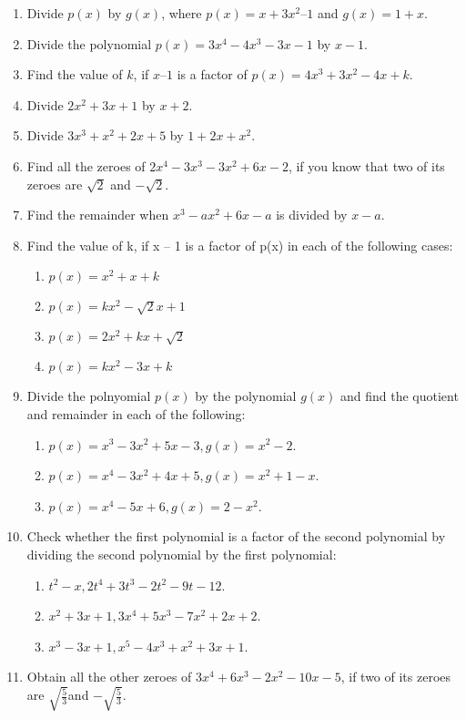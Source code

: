 \begin{enumerate}[label=\thesubsection.\arabic*, ref=\thesubsection.\theenumi,resume*]
%
\item Divide $p(x)$ by $g(x)$, where $p(x) = x + 3x^2– 1$ and $g(x) = 1 + x$.
\item Divide the polynomial $p(x) = 3x^4-4x^3-3x-1 $ by $x-1$.
\item Find the value of $k$, if $x – 1$ is a factor of $p(x) = 4x^3+ 3x^2 - 4x + k$.
%
\item Divide $2x^2+3x+1$ by $x+2$.
\item Divide $3x^3+x^2+2x+5$ by $1+2x+x^2$.
\item Find all the zeroes of $2x^4-3x^3-3x^2+6x-2$, if you know that two of its zeroes are $\sqrt{2}$ and $-\sqrt{2}$.
\item Find the remainder when $x^3-ax^2 +6x-a$ is divided by $x-a$.
\item Find the value of k, if x – 1 is a factor of p(x) in each of the following cases: 
\begin{enumerate}
\item $p(x) = x^2 + x + k$
\item $p(x) = kx^2-\sqrt{2}x+1$
\item $p(x) = 2x^2 + kx + \sqrt{2}$
\item $p(x) = kx^2  - 3x + k$
\end{enumerate}
\item Divide the polnyomial $p(x)$ by the polynomial $g(x)$ and find the quotient and remainder in each of the following:
\begin{enumerate}
\item $p(x) = x^3-3x^2+5x-3, g(x) = x^2-2$.
\item $p(x) = x^4-3x^2+4x+5, g(x) = x^2+1-x$.
\item $p(x) = x^4-5x+6, g(x) = 2-x^2$.
\end{enumerate}
\item Check whether the first polynomial is a factor of the second polynomial by dividing the second polynomial by the first polynomial:
\begin{enumerate}
\item $t^2-x,2t^4+3t^3-2t^2-9t-12$.
\item $x^2+3x+1, 3x^4+5x^3-7x^2+2x+2$.
\item $x^3-3x+1, x^5-4x^3+x^2+3x+1$.
\end{enumerate}
%
\item Obtain all the other zeroes of $3x^4+6x^3-2x^2-10x-5$, if two of its zeroes are $\sqrt{\frac{5}{3}}$and $-\sqrt{\frac{5}{3}}$.

\end{enumerate}
